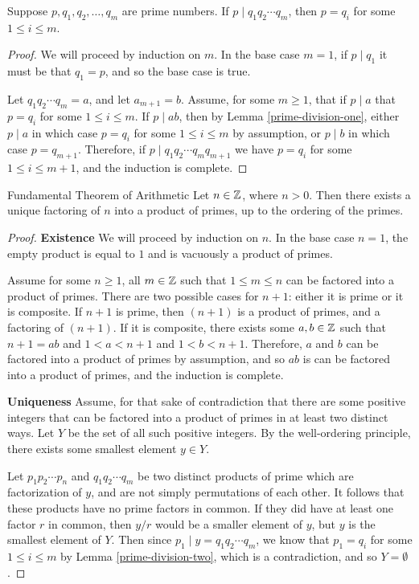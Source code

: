 \begin{lemma}\label{prime-division-two}
    Suppose $p, q_1, q_2, \ldots, q_m$ are prime numbers. If $p \mid q_1q_2\cdots q_m$, then $p = q_i$ for some $1 \leq i \leq m$.
\end{lemma}

\begin{proof}
    We will proceed by induction on $m$. In the base case $m = 1$, if $p\mid q_1$ it must be that $q_1 = p$, and so the base case is true.

    Let $q_1q_2\cdots q_m = a$, and let $a_{m+1} = b$. Assume, for some $m \geq 1$, that if $p \mid a$ that $p = q_i$ for some $1 \leq i \leq m$. If $p \mid ab$, then by Lemma \ref{prime-division-one}, either $p \mid a$ in which case $p = q_i$ for some $1 \leq i \leq m$ by assumption, or  $p \mid b$ in which case $p = q_{m+1}$. Therefore, if $p \mid q_1q_2\cdots q_mq_{m+1}$ we have $p = q_i$ for some $1 \leq i \leq m+1$, and the induction is complete.
\end{proof}

\begin{thm}\label{fundmental-theorem-arithmetic}Fundamental Theorem of Arithmetic\proofbreak
    Let $n \in \mathbb{Z}$, where $n > 0$. Then there exists a unique factoring of $n$ into a product of primes, up to the ordering of the primes.
\end{thm}

\begin{proof}\proofbreak
\textbf{Existence} We will proceed by induction on $n$. In the base case $n=1$, the empty product is equal to $1$ and is vacuously a product of primes.

Assume for some $n \geq 1$, all $m \in \mathbb{Z}$ such that $1 \leq m \leq n$ can be factored into a product of primes. There are two possible cases for $n+1$: either it is prime or it is composite. If $n+1$ is prime, then $(n+1)$ is a product of primes, and a factoring of $(n+1)$. If it is composite, there exists some $a, b \in \mathbb{Z}$ such that $n+1 = ab$ and $1 < a < n+1$ and $1 < b < n+1$. Therefore, $a$ and $b$ can be factored into a product of primes by assumption, and so $ab$ is can be factored into a product of primes, and the induction is complete.

\textbf{Uniqueness} Assume, for that sake of contradiction that there are some positive integers that can be factored into a product of primes in at least two distinct ways. Let $Y$ be the set of all such positive integers. By the well-ordering principle, there exists some smallest element $y \in Y$.

Let $p_1p_2\cdots p_n$ and $q_1q_2\cdots q_m$ be two distinct products of prime which are factorization of $y$, and are not simply permutations of each other. It follows that these products have no prime factors in common. If they did have at least one factor $r$ in common, then $y/r$ would be a smaller element of $y$, but $y$ is the smallest element of $Y$. Then since $p_1 \mid y = q_1q_2\cdots q_m$, we know that $p_1 = q_i$ for some $1 \leq i \leq m$ by Lemma \ref{prime-division-two}, which is a contradiction, and so $Y = \emptyset$.
\end{proof}

